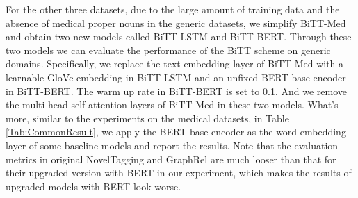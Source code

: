 \documentclass[conference]{IEEEtran}
\begin{document}
\begin{table}[t]
    \centering
    \caption{Statistics of the training set and the testing set of the five datasets. \emph{ELS Ratio} indicates \emph{ELS} / Overlap Samples.}\label{Tab:Dataset}
\end{table}

For the other three datasets, due to the large amount of training data and the absence of medical proper nouns in the generic datasets, we simplify BiTT-Med and obtain two new models called BiTT-LSTM and BiTT-BERT. Through these two models we can evaluate the performance of the BiTT scheme on generic domains. Specifically, we replace the text embedding layer of BiTT-Med with a learnable GloVe embedding in BiTT-LSTM and an unfixed BERT-base encoder in BiTT-BERT. The warm up rate in BiTT-BERT is set to 0.1. And we remove the multi-head self-attention layers of BiTT-Med in these two models. What's more, similar to the experiments on the medical datasets, in Table \ref{Tab:CommonResult}, we apply the BERT-base encoder as the word embedding layer of some baseline models and report the results. Note that the evaluation metrics in original NovelTagging and GraphRel are much looser than that for their upgraded version with BERT in our experiment, which makes the results of upgraded models with BERT look worse.
\end{document}
